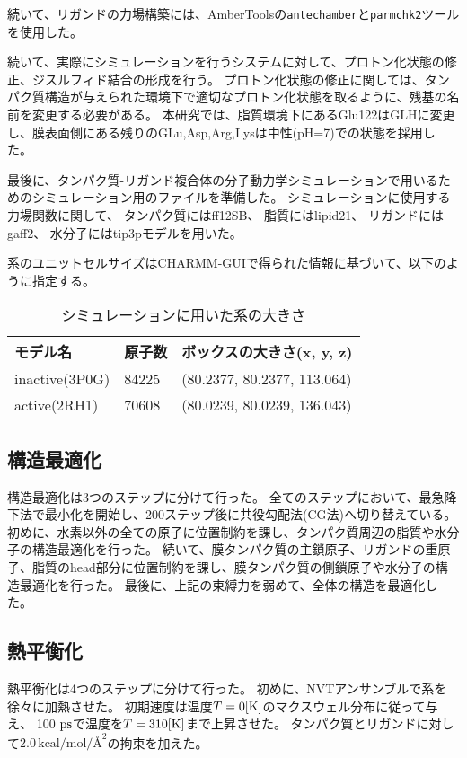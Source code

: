 続いて、リガンドの力場構築には、AmberToolsの\texttt{antechamber}と\texttt{parmchk2}ツールを使用した。

続いて、実際にシミュレーションを行うシステムに対して、プロトン化状態の修正、ジスルフィド結合の形成を行う。
プロトン化状態の修正に関しては、タンパク質構造が与えられた環境下で適切なプロトン化状態を取るように、残基の名前を変更する必要がある。
本研究では、脂質環境下にあるGlu122はGLHに変更し、膜表面側にある残りのGLu,Asp,Arg,Lysは中性(pH=7)での状態を採用した。

最後に、タンパク質-リガンド複合体の分子動力学シミュレーションで用いるためのシミュレーション用のファイルを準備した。
シミュレーションに使用する力場関数に関して、
タンパク質にはff12SB、
脂質にはlipid21、
リガンドにはgaff2、
水分子にはtip3pモデルを用いた。

系のユニットセルサイズはCHARMM-GUIで得られた情報に基づいて、以下のように指定する。
\begin{table}[!ht]
    \centering
    \caption{シミュレーションに用いた系の大きさ}
    \begin{tabular}{lll}
      \hline
      モデル名          & 原子数  & ボックスの大きさ(x, y, z) \\
      \hline 
      inactive(3P0G)  & 84225 & (80.2377, 80.2377, 113.064) \\ 
      active(2RH1)    & 70608 & (80.0239, 80.0239, 136.043) \\ 
    \end{tabular}
    \label{tab:system_size}
  \end{table}
  

\subsection{構造最適化}
構造最適化は3つのステップに分けて行った。
全てのステップにおいて、最急降下法で最小化を開始し、200ステップ後に共役勾配法(CG法)へ切り替えている。
初めに、水素以外の全ての原子に位置制約を課し、タンパク質周辺の脂質や水分子の構造最適化を行った。
続いて、膜タンパク質の主鎖原子、リガンドの重原子、脂質のhead部分に位置制約を課し、膜タンパク質の側鎖原子や水分子の構造最適化を行った。
最後に、上記の束縛力を弱めて、全体の構造を最適化した。

\subsection{熱平衡化}
熱平衡化は4つのステップに分けて行った。
初めに、NVTアンサンブルで系を徐々に加熱させた。
初期速度は温度$T = 0 \rm{[K]}$のマクスウェル分布に従って与え、 
100 $\rm{ps}$で温度を$T = 310 \rm{[K]}$まで上昇させた。
タンパク質とリガンドに対して$2.0 \, \text{kcal/mol/\AA}^2$の拘束を加えた。

